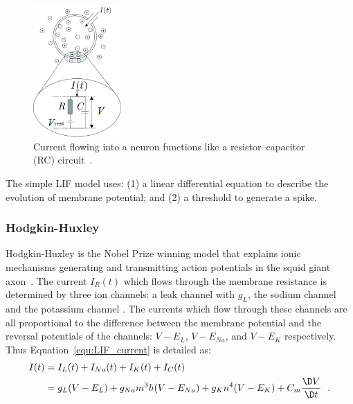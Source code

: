 \begin{figure}[tb!]
	\centering
	\includegraphics[width=0.3\textwidth]{pics_snn/RC.png}
	\caption{Current flowing into a neuron functions like a resistor–capacitor (RC) circuit~\citep{gerstner2014neuronal}.}
	\label{Fig:rc}
\end{figure}
The simple LIF model uses: (1) a linear differential equation to describe the evolution of membrane potential;
and (2) a threshold to generate a spike.

\subsubsection{Hodgkin-Huxley \DIFaddbegin {}\DIFaddend }
\DIFaddbegin {}\DIFaddend Hodgkin-Huxley is the Nobel Prize winning model that explains ionic mechanisms generating and transmitting action potentials in the squid giant axon~\citep{hodgkin1939action}.
The current $I_R(t)$ which flows through the membrane resistance is determined by three ion channels: a leak channel with \DIFdelbegin {}\DIFdelend \DIFaddbegin {}\DIFaddend $g_L$, the sodium channel \DIFdelbegin {}\DIFdelend \DIFaddbegin {}\DIFaddend and the potassium channel \DIFdelbegin {}\DIFdelend \DIFaddbegin {}\DIFaddend .
The currents which flow through these channels are all proportional to the difference between the membrane potential and the reversal potentials of the channels: $V-E_L$, $V-E_{Na}$, and $V-E_{K}$ respectively.
Thus Equation~\ref{equ:LIF_current} is detailed as:
\begin{equation}
\begin{aligned}
I(t) &= I_L(t) + I_{Na}(t) + I_{K}(t)+ I_C(t) \\
&= g_L(V-E_L) + g_{Na}m^3h(V-E_{Na}) + g_{K}n^4(V-E_{K})  + C_m \dfrac{\D V}{\D t}~~.
\end{aligned}
\label{equ:HH_current}
\end{equation}

